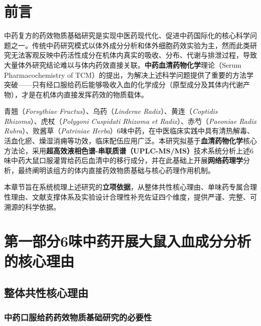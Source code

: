 \documentclass[12pt,a4paper,UTF8,scheme=chinese]{ctexart}
\newcommand{\herbname}[1]{\textit{#1}}
\newcommand{\keyterm}[1]{\textbf{#1}}
\begin{document}
\section*{前言}
\setcounter{page}{1}

中药复方的药效物质基础研究是实现中医药现代化、促进中药国际化的核心科学问题之一。传统中药研究模式以体外成分分析和体外细胞药效实验为主，然而此类研究无法客观反映中药活性成分在机体内真实的吸收、分布、代谢与排泄过程，导致大量体外研究结论难以与体内药效直接关联。\keyterm{中药血清药物化学}理论（Serum Pharmacochemistry of TCM）的提出，为解决上述科学问题提供了重要的方法学突破——只有经口服给药后能够吸收入血的化学成分（原型成分及其体内代谢产物），才是在机体内直接发挥药效的物质载体\cite{Wang2016,Wang2012}。

青翘（\herbname{Forsythiae Fructus}）、乌药（\herbname{Linderae Radix}）、黄连（\herbname{Coptidis Rhizoma}）、虎杖（\herbname{Polygoni Cuspidati Rhizoma et Radix}）、赤芍（\herbname{Paeoniae Radix Rubra}）、败酱草（\herbname{Patriniae Herba}）6味中药，在中医临床实践中具有清热解毒、活血化瘀、燥湿消痈等功效，临床配伍应用广泛。本研究拟基于\keyterm{血清药物化学}核心方法论，采用\keyterm{超高效液相色谱-串联质谱（UPLC-MS/MS）}技术系统分析上述6味中药大鼠口服灌胃给药后血清中的移行成分，并在此基础上开展\keyterm{网络药理学}分析，最终阐明该组方的体内直接药效物质基础与核心药理作用机制。

本章节旨在系统梳理上述研究的\textbf{立项依据}，从整体共性核心理由、单味药专属合理性理由、文献支撑体系及实验设计合理性补充佐证四个维度，提供严谨、完整、可溯源的科学依据。

\vspace{1em}

\section{第一部分\enspace 6味中药开展大鼠入血成分分析的核心理由}

\subsection{整体共性核心理由}

\subsubsection{中药口服给药药效物质基础研究的必要性}
\end{document}
